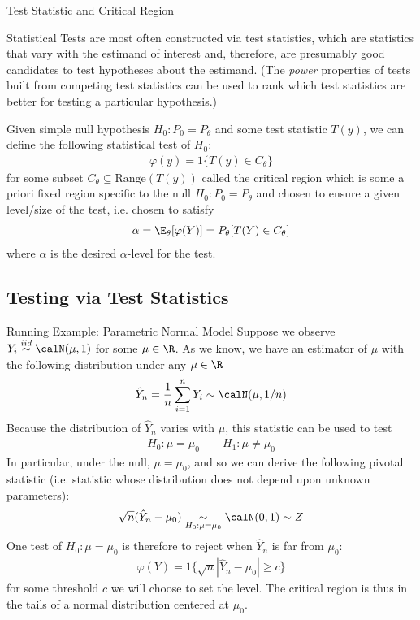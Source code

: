 \documentclass[aspectratio=169, handout]{beamer}
\newcommand{\iid}{\overset{iid}{\sim}}
\newcommand{\sumin}{\sum^n_{i=1}}
\begin{document}
{\footnotesize
\begin{frame}{Test Statistic and Critical Region}

Statistical Tests are most often constructed via
\alert{test statistics}, which are statistics that \alert{vary} with the
estimand of interest and, therefore, are presumably good candidates to
test hypotheses about the estimand. (The \emph{power} properties of
tests built from competing test statistics can be used to rank which
test statistics are better for testing a particular hypothesis.)
\pause

Given simple null hypothesis $H_0:P_0=P_{\theta}$ and some test
statistic $T(y)$, we can define the following statistical test of $H_0$:
\begin{align*}
  \varphi(y)
  = {1}\{T(y)\in C_\theta\}
\end{align*}
for some subset $C_\theta\subseteq\text{Range}(T(y))$ called the
\alert{critical region}
\pause
which is some a priori \alert{fixed} region specific to the null
$H_0:P_0=P_\theta$ and chosen to ensure a given level/size of the test,
i.e. chosen to satisfy
\begin{align}
  \alpha
  = \E_\theta[\varphi(Y)]
  = P_\theta[T(Y)\in C_{\theta}]
\end{align}
where $\alpha$ is the desired $\alpha$-level for the test.
\end{frame}
}


\subsection{Testing via Test Statistics}

{\footnotesize
\begin{frame}{Running Example: Parametric Normal Model}
Suppose we observe $Y_i\iid \calN(\mu,1)$ for some $\mu\in\R$.
As we know, we have an estimator of $\mu$ with the following
distribution under any $\mu\in\R$
\begin{align*}
  \hat{Y}_n
  =
  \frac{1}{n}
  \sumin
  Y_i
  \sim
  \calN(\mu,1/n)
\end{align*}
\pause
Because the distribution of $\hat{Y}_n$ varies with $\mu$,
this statistic can be used to test
\begin{align*}
  H_0: \mu=\mu_0
  \qquad
  H_1: \mu\neq \mu_0
\end{align*}
\pause
In particular, under the null, $\mu=\mu_0$, and so we can derive the
following \alert{pivotal} statistic (i.e. statistic whose distribution
does not depend upon unknown parameters):
\begin{align*}
  \sqrt{n}(\hat{Y}_n - \mu_0)
  \underset{H_0:\mu=\mu_0}{\sim}
  \calN(0,1)\sim Z
\end{align*}
\pause
One test of $H_0:\mu=\mu_0$ is therefore to reject when $\hat{Y}_n$ is
far from $\mu_0$:
\begin{align*}
  \varphi(Y)
  =
  {1}\{\sqrt{n}|\hat{Y}_n-\mu_0|\geq c\}
\end{align*}
for some threshold $c$ we will choose to set the level.
The \alert{critical region} is thus in the tails of a normal
distribution centered at $\mu_0$.
\end{frame}
}
\end{document}
